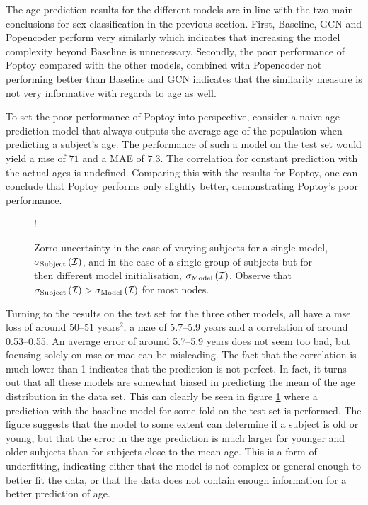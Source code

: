 The age prediction results for the different models are in line with the two main conclusions for sex classification in the previous section. First, Baseline, GCN and Popencoder perform very similarly which indicates that increasing the model complexity beyond Baseline is unnecessary. Secondly, the poor performance of Poptoy compared with the other models, combined with Popencoder not performing better than Baseline and GCN indicates that the similarity measure is not very informative with regards to age as well. 

To set the poor performance of Poptoy into perspective, consider a naive age prediction model that always outputs the average age of the population when predicting a subject's age. The performance of such a model on the test set would yield a \acrshort{mse} of $71$ and a MAE of $7.3$. The correlation for constant prediction with the actual ages is undefined. Comparing this with the results for Poptoy, one can conclude that Poptoy performs only slightly better, demonstrating Poptoy's poor performance.

\begin{figure}[!htbp]
    \centering
    \begin{center}
        \resizebox {0.6\linewidth} {!} {
            
        }
    \end{center}
    \caption{Zorro uncertainty in the case of varying subjects for a single model, $\sigma_{\rm{Subject}}\left(\mathcal{I}\right)$, and in the case of a single group of subjects but for then different model initialisation, $\sigma_{\rm{Model}}\left(\mathcal{I}\right)$. Observe that $\sigma_{\rm{Subject}}\left(\mathcal{I}\right) > \sigma_{\rm{Model}}\left(\mathcal{I}\right)$ for most nodes.}
    \label{fig:age_regression}
\end{figure}

Turning to the results on the test set for the three other models, all have a \acrshort{mse} loss of around 50--51 years$^2$, a \acrshort{mae} of 5.7--5.9 years and a correlation of around 0.53--0.55. An average error of around 5.7--5.9 years does not seem too bad, but focusing solely on \acrshort{mse} or \acrshort{mae} can be misleading. The fact that the correlation is much lower than 1 indicates that the prediction is not perfect. In fact, it turns out that all these models are somewhat biased in predicting the mean of the age distribution in the data set. This can clearly be seen in figure \cref{fig:age_regression} where a prediction with the baseline model for some fold on the test set is performed. The figure suggests that the model to some extent can determine if a subject is old or young, but that the error in the age prediction is much larger for younger and older subjects than for subjects close to the mean age. This is a form of underfitting, indicating either that the model is not complex or general enough to better fit the data, or that the data does not contain enough information for a better prediction of age.

